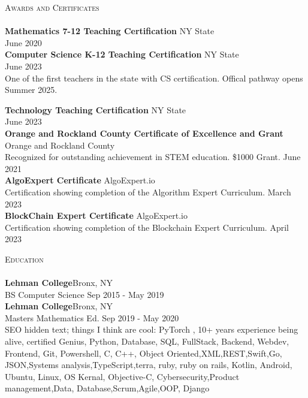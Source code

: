 \documentclass[a4paper]{article}
\newcommand{\lineunder} {
    \vspace*{-8pt} \\
    \hspace*{-18pt} \hrulefill \\
}
\newcommand{\header} [1] {
    {\hspace*{-18pt}\vspace*{6pt} \textsc{#1}}
    \vspace*{-6pt} \lineunder
}
\begin{document}
\header{Awards and Certificates}
\textbf{Mathematics 7-12 Teaching Certification} \hfill NY State\\
\hfill June 2020\\
\textbf{Computer Science K-12 Teaching Certification} \hfill NY State\\
\hfill June 2023\\
One of the first teachers in the state with CS certification. Offical pathway opens Summer 2025.

\textbf{Technology Teaching Certification} \hfill NY State\\
\hfill June 2023\\
\textbf{Orange and Rockland County Certificate of Excellence and Grant} \hfill Orange and Rockland County\\
Recognized for outstanding achievement in STEM education. \$1000 Grant. \hfill June 2021\\
\vspace*{2mm}
\textbf{AlgoExpert Certificate} \hfill AlgoExpert.io\\
Certification showing completion of the Algorithm Expert Curriculum. \hfill March 2023\\
\vspace*{2mm}
\textbf{BlockChain Expert Certificate} \hfill AlgoExpert.io\\
Certification showing completion of the Blockchain Expert Curriculum. \hfill April 2023\\
\vspace*{2mm}

\header{Education}
\textbf{Lehman College}\hfill Bronx, NY\\
BS Computer Science \hfill Sep 2015 - May 2019\\
\vspace{2mm}
\textbf{Lehman College}\hfill Bronx, NY\\
Masters Mathematics Ed. \hfill Sep 2019 - May 2020\\
\vspace{2mm}
\color{white}
\tiny
SEO hidden text; things I think are cool: PyTorch , 10+ years experience being alive, certified Genius, Python, Database, SQL, FullStack, Backend, Webdev, Frontend, Git, Powershell, C, C++, Object Oriented,XML,REST,Swift,Go, JSON,Systems analysis,TypeScript,terra, ruby, ruby on rails, Kotlin, Android, Ubuntu, Linux, OS Kernal, Objective-C, Cybersecurity,Product management,Data, Database,Scrum,Agile,OOP, Django

\ 
\end{document}

